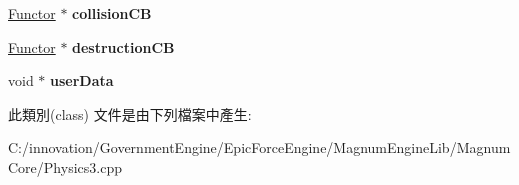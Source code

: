 \begin{DoxyCompactItemize}
\item 
\hyperlink{class_i_dream_sky_1_1_functor}{Functor} $\ast$ {\bfseries collision\+CB}\hypertarget{class_rigid_body_desc_a9c0c733bb87320ed86033fe2cfaad14a}{}\label{class_rigid_body_desc_a9c0c733bb87320ed86033fe2cfaad14a}

\item 
\hyperlink{class_i_dream_sky_1_1_functor}{Functor} $\ast$ {\bfseries destruction\+CB}\hypertarget{class_rigid_body_desc_a7b95d01916e0c7f0f5447d82190f4c9c}{}\label{class_rigid_body_desc_a7b95d01916e0c7f0f5447d82190f4c9c}

\item 
void $\ast$ {\bfseries user\+Data}\hypertarget{class_rigid_body_desc_a4a0e433f4d60f1d22129439ad86ef73a}{}\label{class_rigid_body_desc_a4a0e433f4d60f1d22129439ad86ef73a}

\end{DoxyCompactItemize}


此類別(class) 文件是由下列檔案中產生\+:\begin{DoxyCompactItemize}
\item 
C\+:/innovation/\+Government\+Engine/\+Epic\+Force\+Engine/\+Magnum\+Engine\+Lib/\+Magnum\+Core/Physics3.\+cpp\end{DoxyCompactItemize}
